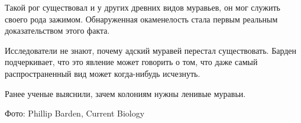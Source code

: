 Такой рог существовал и у других древних видов муравьев, он мог служить своего
рода зажимом. Обнаруженная окаменелость стала первым реальным доказательством
этого факта.

Исследователи не знают, почему адский муравей перестал существовать. Барден
подчеркивает, что это явление может говорить о том, что даже самый
распространенный вид может когда-нибудь исчезнуть.   

Ранее ученые выяснили, зачем колониям нужны ленивые муравьи.

Фото: Phillip Barden, Current Biology

